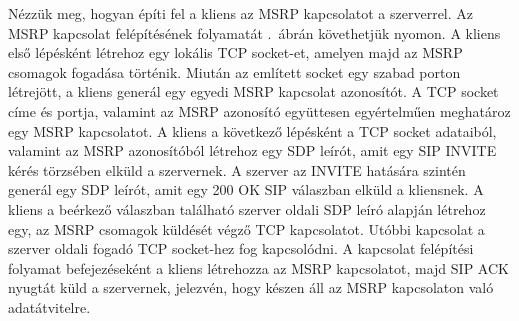 \medskip
Nézzük meg, hogyan építi fel a kliens az MSRP kapcsolatot a szerverrel. Az MSRP kapcsolat felépítésének folyamatát .~ábrán követhetjük nyomon. A kliens első lépésként létrehoz egy lokális TCP socket-et, amelyen majd az MSRP csomagok fogadása történik. Miután az említett socket egy szabad porton létrejött, a kliens generál egy egyedi MSRP kapcsolat azonosítót. A TCP socket címe és portja, valamint az MSRP azonosító együttesen egyértelműen meghatároz egy MSRP kapcsolatot. A kliens a következő lépésként a TCP socket adataiból, valamint az MSRP azonosítóból létrehoz egy SDP leírót, amit egy SIP INVITE kérés törzsében elküld a szervernek. A szerver az INVITE hatására szintén generál egy SDP leírót, amit egy 200 OK SIP válaszban elküld a kliensnek. A kliens a beérkező válaszban található szerver oldali SDP leíró alapján létrehoz egy, az MSRP csomagok küldését végző TCP kapcsolatot. Utóbbi kapcsolat a szerver oldali fogadó TCP socket-hez fog kapcsolódni. A kapcsolat felépítési folyamat befejezéseként a kliens létrehozza az MSRP kapcsolatot, majd SIP ACK nyugtát küld a szervernek, jelezvén, hogy készen áll az MSRP kapcsolaton való adatátvitelre.

